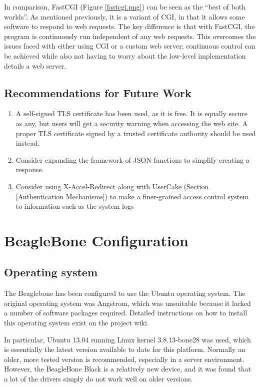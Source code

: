 In comparison, FastCGI (Figure \ref{fastcgi.png}) can be seen as the ``best of both worlds''. As mentioned previously, it is a variant of CGI, in that it allows some software to respond to web requests. The key difference is that with FastCGI, the program is continuously run independent of any web requests. This overcomes the issues faced with either using CGI or a custom web server; continuous control can be achieved while also not having to worry about the low-level implementation details a web server.



\subsection{Recommendations for Future Work}

\begin{enumerate}
	\item A self-signed TLS certificate has been used, as it is free. It is equally secure as any, but users will get a security warning when accessing the web site. A proper TLS certificate signed by a trusted certificate authority should be used instead.
	\item Consider expanding the framework of JSON functions to simplify creating a response. 
	\item Consider using X-Accel-Redirect along with UserCake (Section \ref{Authentication Mechanisms}) to make a finer-grained access control system to information such as the system logs
\end{enumerate}

\section{BeagleBone Configuration}\label{BeagleBone Configuration}

\subsection{Operating system}
The Beaglebone has been configured to use the Ubuntu operating system. The original operating system was Angstrom, which was unsuitable because it lacked a number of software packages required. Detailed instructions on how to install this operating system exist on the project wiki\cite{mctx3420_wiki}.

In particular, Ubuntu 13.04 running Linux kernel 3.8.13-bone28 was used, which is essentially the latest version available to date for this platform. Normally an older, more tested version is recommended, especially in a server environment. However, the BeagleBone Black is a relatively new device, and it was found that a lot of the drivers simply do not work well on older versions.

